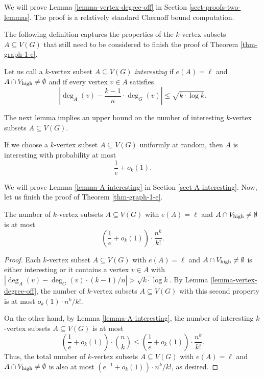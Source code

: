 We will prove Lemma \ref{lemma-vertex-degree-off} in Section \ref{sect-proofs-two-lemmas}. The proof is a relatively standard Chernoff bound computation.

The following definition captures the properties of the $k$-vertex subsets $A\subseteq V(G)$ that still need to be considered to finish the proof of Theorem \ref{thm-graph-1-e}.

\begin{definition}Let us call a $k$-vertex subset $A\subseteq V(G)$ \emph{interesting} if $e(A)=\ell$ and $A\cap V_{\textnormal{high}}\neq \emptyset$ and if every vertex $v\in A$ satisfies
\[\left\vert\deg_A(v)-\frac{k-1}{n}\cdot \deg_G(v)\right\vert\leq \sqrt{k\cdot \log k}.\]
\end{definition}

The next lemma implies an upper bound on the number of interesting $k$-vertex subsets $A\subseteq V(G)$.

\begin{lemma}\label{lemma-A-interesting}If we choose a $k$-vertex subset $A\subseteq V(G)$ uniformly at random, then $A$ is interesting with probability at most
\[\frac{1}{e}+o_k(1).\]
\end{lemma}

We will prove Lemma \ref{lemma-A-interesting} in Section \ref{sect-A-interesting}. Now, let us finish the proof of Theorem \ref{thm-graph-1-e}.

\begin{corollary}\label{coro-Vh}The number of $k$-vertex subsets $A\subseteq V(G)$ with $e(A)=\ell$ and $A\cap V_{\textnormal{high}}\neq \emptyset$ is at most
\[\left(\frac{1}{e}+o_k(1)\right)\cdot \frac{n^k}{k!}.\]
\end{corollary}
\begin{proof}Each $k$-vertex subset $A\subseteq V(G)$ with $e(A)=\ell$ and $A\cap V_{\textnormal{high}}\neq \emptyset$ is either interesting or it contains a vertex $v\in A$ with $\left\vert\deg_A(v)-\deg_G(v)\cdot (k-1)/n\right\vert>\sqrt{k\cdot \log k}$. By Lemma \ref{lemma-vertex-degree-off}, the number of  $k$-vertex subsets $A\subseteq V(G)$ with this second property is at most $o_k(1)\cdot n^k/k!$.

On the other hand, by Lemma \ref{lemma-A-interesting}, the number of interesting $k$-vertex subsets $A\subseteq V(G)$ is at most
\[\left(\frac{1}{e}+o_k(1)\right)\cdot {n\choose k}\leq \left(\frac{1}{e}+o_k(1)\right)\cdot \frac{n^k}{k!}.\]
Thus, the total number of $k$-vertex subsets $A\subseteq V(G)$ with $e(A)=\ell$ and $A\cap V_{\textnormal{high}}\neq \emptyset$ is also at most $(e^{-1}+o_k(1))\cdot n^k/k!$, as desired.
\end{proof}

